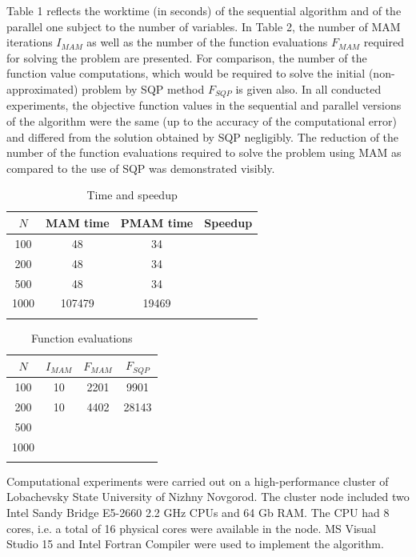 \documentclass[runningheads,a4paper]{llncs}
\begin{document}
Table 1 reflects the worktime (in seconds) of the sequential algorithm and of the parallel one subject to the number of variables. In Table 2, the number of MAM iterations $I_{MAM}$ as well as the number of the function evaluations $F_{MAM}$ required for solving the problem are presented. For comparison, the number of the function value computations, which would be required to solve the initial (non-approximated) problem by SQP method $F_{SQP}$ is given also. In all conducted experiments, the objective function values in the sequential and parallel versions of the algorithm were the same (up to the accuracy of the computational error) and differed from the solution obtained by SQP negligibly. The reduction of the number of the function evaluations required to solve the problem using MAM as compared to the use of SQP was demonstrated 
visibly.

\begin{table}
	\caption{Time and speedup}
	\label{tab:1}
	\center
	\begin{tabular}{cccc}
		\hline\noalign{\smallskip}
		$N$ & MAM time & PMAM time & Speedup \\
		\hline\noalign{\smallskip}
		100 & 48 &  34 &   \\
		200 & 48 &  34 &   \\
		500 & 48 &  34 &   \\
		1000 & 107479  &  19469 &   \\
		\noalign{\smallskip}\hline
	\end{tabular}
\end{table}

\begin{table}
	\caption{Function evaluations}
	\label{tab:2}
	\center
	\begin{tabular}{cccc}
		\hline\noalign{\smallskip}
		$N$ & $I_{MAM}$  & $F_{MAM}$ & $F_{SQP}$ \\
		\hline\noalign{\smallskip}
		100 & 10 &  2201 & 9901 \\
		200 & 10 &  4402 & 28143 \\
		500 &  &   &  \\
		1000 &  &   &  \\
		\noalign{\smallskip}\hline
	\end{tabular}
\end{table}

Computational experiments were carried out on a high-performance cluster of Lobachevsky State University of Nizhny Novgorod. The cluster node included two Intel Sandy Bridge E5-2660 2.2 GHz CPUs and 64 Gb RAM. The CPU had 8 cores, i.e. a total of 16 physical cores were available in the node. MS Visual Studio 15 and Intel Fortran Compiler were used to implement the algorithm.
\end{document}
